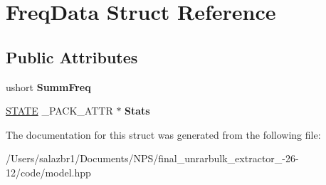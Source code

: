 \hypertarget{struct_freq_data}{\section{Freq\-Data Struct Reference}
\label{struct_freq_data}
}
\subsection*{Public Attributes}
\begin{DoxyCompactItemize}
\item 
\hypertarget{struct_freq_data_a191cac4679a18afa6ece469aee3846a7}{ushort {\bfseries Summ\-Freq}}\label{struct_freq_data_a191cac4679a18afa6ece469aee3846a7}

\item 
\hypertarget{struct_freq_data_a114ed6d41a3b8df8c39ba3d1917ee76b}{\hyperlink{struct_s_t_a_t_e}{S\-T\-A\-T\-E} \-\_\-\-P\-A\-C\-K\-\_\-\-A\-T\-T\-R $\ast$ {\bfseries Stats}}\label{struct_freq_data_a114ed6d41a3b8df8c39ba3d1917ee76b}

\end{DoxyCompactItemize}


The documentation for this struct was generated from the following file\-:\begin{DoxyCompactItemize}
\item 
/\-Users/salazbr1/\-Documents/\-N\-P\-S/final\-\_\-unrarbulk\-\_\-extractor\-\_-\/26-\/12/code/model.\-hpp\end{DoxyCompactItemize}
